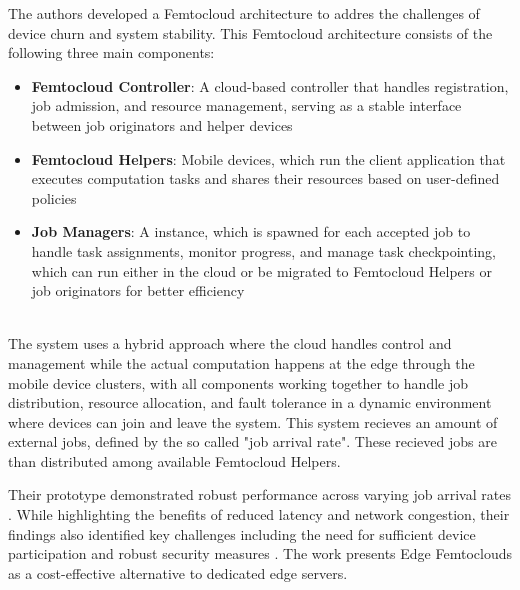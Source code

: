 The authors developed a Femtocloud architecture to addres the challenges of device churn and system stability. This Femtocloud architecture consists of the following three main components: 
\begin{itemize}
  \item \textbf{Femtocloud Controller}: A cloud-based controller that handles registration, job admission, and resource management, serving as a stable interface between job originators and helper devices
  \item \textbf{Femtocloud Helpers}: Mobile devices, which run the client application that executes computation tasks and shares their resources based on user-defined policies
  \item \textbf{Job Managers}: A instance, which is spawned for each accepted job to handle task assignments, monitor progress, and manage task checkpointing, which can run either in the cloud or be migrated to Femtocloud Helpers or job originators for better efficiency
\end{itemize}
~\\
The system uses a hybrid approach where the cloud handles control and management while the actual computation happens at the edge through the mobile device clusters, with all components working together to handle job distribution, resource allocation, and fault tolerance in a dynamic environment where devices can join and leave the system. This system recieves an amount of external jobs, defined by the so called "job arrival rate". These recieved jobs are than distributed among available Femtocloud Helpers.

Their prototype demonstrated robust performance across varying job arrival rates \cite{relatedwork:mobilecloud}. While highlighting the benefits of reduced latency and network congestion, their findings also identified key challenges including the need for sufficient device participation and robust security measures \cite{relatedwork:mobilecloud}. The work presents Edge Femtoclouds as a cost-effective alternative to dedicated edge servers. 

